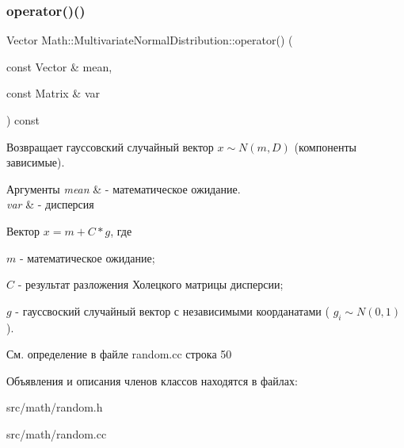\subsubsection{\texorpdfstring{operator()()}{operator()()}}
{\footnotesize\ttfamily Vector Math\+::\+Multivariate\+Normal\+Distribution\+::operator() (\begin{DoxyParamCaption}\item[{const Vector \&}]{mean,  }\item[{const Matrix \&}]{var }\end{DoxyParamCaption}) const}

Возвращает гауссовский случайный вектор $x \sim N(m, D)$ (компоненты зависимые). 
\begin{DoxyParams}{Аргументы}
{\em mean} & -\/ математическое ожидание. \\
\hline
{\em var} & -\/ дисперсия\\
\hline
\end{DoxyParams}
Вектор $x = m + C * g$, где

$m$ -\/ математическое ожидание;

$C$ -\/ результат разложения Холецкого матрицы дисперсии;

$g$ -\/ гауссвоский случайный вектор с независимыми коорданатами ( $g_i \sim N(0,1)$). 

См. определение в файле random.\+cc строка 50



Объявления и описания членов классов находятся в файлах\+:\begin{DoxyCompactItemize}
\item 
src/math/random.\+h\item 
src/math/random.\+cc\end{DoxyCompactItemize}
